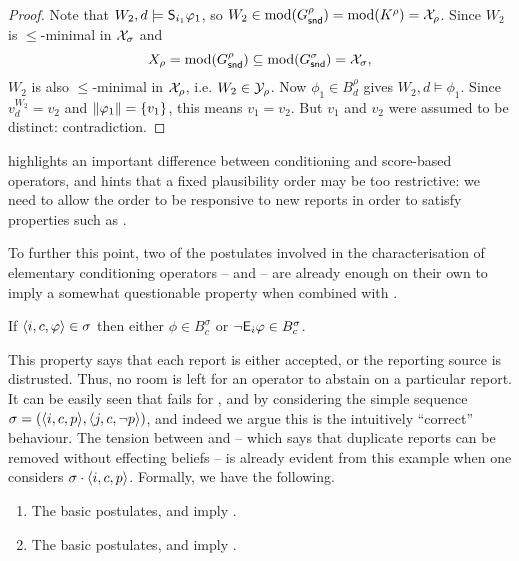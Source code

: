 \begin{proof}
    Note that $W_2, d \models \S_{i_1}{\phi_1}$, so $W_2 \in \mods(G^\rho_\snd)
    = \mods(K^\rho) = \X_\rho$. Since $W_2$ is $\le$-minimal in $\X_\sigma$ and
    \[
        X_\rho = \mods(G^\rho_\snd) \subseteq \mods(G^\sigma_\snd) = \X_\sigma,
    \]
    $W_2$ is also $\le$-minimal in $\X_\rho$, i.e. $W_2 \in \Y_\rho$. Now
    $\phi_1 \in B^\rho_d$ gives $W_2, d \models \phi_1$. Since $v^{W_2}_d =
    v_2$ and $\propmods{\phi_1} = \{v_1\}$, this means $v_1 = v_2$. But $v_1$
    and $v_2$ were assumed to be distinct: contradiction.

\end{proof}

 highlights an important
difference between conditioning and score-based operators, and hints that
a fixed plausibility order may be too restrictive: we
need to allow the order to be responsive to new reports in order to satisfy
properties such as \strongcondsucc{}.

To further this point, two of the postulates involved in the characterisation of
elementary conditioning operators -- \duprem{} and \incvac{} -- are already
enough on their own to imply a somewhat questionable property when combined
with \strongcondsucc{}.

\begin{axiom}[\decisiveness{}]
    If $\tuple{i, c, \phi} \in \sigma$ then either $\phi \in B^\sigma_c$ or
    $\neg\E_i\phi \in B^\sigma_c$.
\end{axiom}

This property says that each report is either accepted, or the reporting source
is distrusted. Thus, no room is left for an operator to abstain on a particular
report. It can be easily seen that \decisiveness{} fails for \varbasedcond{},
\partbasedcond{} and \scorebasedop{} by considering the simple sequence $\sigma
= (\tuple{i, c, p}, \tuple{j, c, \neg{p}})$, and indeed we argue this is the
intuitively ``correct'' behaviour. The tension between \strongcondsucc{} and
\duprem{} -- which says that duplicate reports can be removed without effecting
beliefs -- is already evident from this example when one considers $\sigma
\concat \tuple{i, c, p}$. Formally, we have the following.

\begin{proposition}\leavevmode
    \begin{enumerate}
        \item\label{kr_item_duprem_strongcondsucc_deciciveness} The basic
            postulates, \duprem{} and \strongcondsucc{} imply \decisiveness{}.
        \item The basic postulates, \incvac{} and \strongcondsucc{} imply
              \decisiveness{}.
    \end{enumerate}
\end{proposition}

